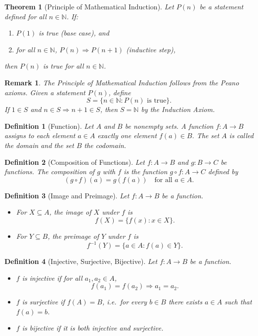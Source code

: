 \documentclass[12pt]{article}
\newtheorem*{remark}{Remark}
\newtheorem{theorem}{Theorem}
\newtheorem{definition}{Definition}
\begin{document}
\begin{theorem}[Principle of Mathematical Induction]
Let $P(n)$ be a statement defined for all $n \in \mathbb{N}$.  
If:
\begin{enumerate}
  \item $P(1)$ is true (base case), and
  \item for all $n \in \mathbb{N}$, $P(n) \Rightarrow P(n+1)$ (inductive step),
\end{enumerate}
then $P(n)$ is true for all $n \in \mathbb{N}$.
\end{theorem}

\begin{remark}
The Principle of Mathematical Induction follows from the Peano axioms.
Given a statement $P(n)$, define
\[
S = \{ n \in \mathbb{N} : P(n) \text{ is true} \}.
\]
If $1 \in S$ and $n \in S \Rightarrow n+1 \in S$, then $S=\mathbb{N}$ by the Induction Axiom.
\end{remark}

\begin{definition}[Function]
Let $A$ and $B$ be nonempty sets.  
A \emph{function} $f : A \to B$ assigns to each element $a \in A$ exactly one element $f(a) \in B$.
The set $A$ is called the \emph{domain} and the set $B$ the \emph{codomain}.
\end{definition}

\begin{definition}[Composition of Functions]
Let $f : A \to B$ and $g : B \to C$ be functions.  
The \emph{composition} of $g$ with $f$ is the function $g \circ f : A \to C$ defined by
\[
(g \circ f)(a) = g(f(a)) \quad \text{for all } a \in A.
\]
\end{definition}

\begin{definition}[Image and Preimage]
Let $f : A \to B$ be a function.
\begin{itemize}
  \item For $X \subseteq A$, the \emph{image} of $X$ under $f$ is
  \[
    f(X) = \{ f(x) : x \in X \}.
  \]
  \item For $Y \subseteq B$, the \emph{preimage} of $Y$ under $f$ is
  \[
    f^{-1}(Y) = \{ a \in A : f(a) \in Y \}.
  \]
\end{itemize}
\end{definition}

\begin{definition}[Injective, Surjective, Bijective]
Let $f : A \to B$ be a function.
\begin{itemize}
  \item $f$ is \emph{injective} if for all $a_1,a_2 \in A$,
  \[
    f(a_1)=f(a_2) \Rightarrow a_1=a_2.
  \]
  \item $f$ is \emph{surjective} if $f(A)=B$, i.e.\ for every $b \in B$ there exists $a \in A$ such that $f(a)=b$.
  \item $f$ is \emph{bijective} if it is both injective and surjective.
\end{itemize}
\end{definition}
\end{document}
